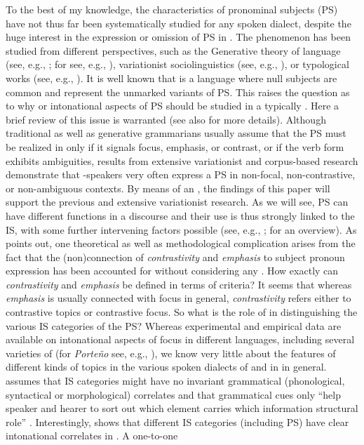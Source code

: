 \documentclass[output=paper]{langsci/langscibook}
\begin{document}
To the best of my knowledge, the  characteristics of pronominal subjects (PS) have not thus far been systematically studied for any spoken  dialect, despite the huge interest in the expression or omission of PS in . The phenomenon has been studied from different perspectives, such as the Generative theory of language (see, e.g., \citealt{Chomsky1981,Chomsky1995,Rizzi1986,Biberauer2010}; for  see, e.g., \citealt{Lujan1999}), variationist sociolinguistics (see, e.g., \citealt{SilvaCorvalan.2001,Otheguy2007,Carvalho2015}), or typological works (see, e.g., \citealt{Dryer2013}). It is well known that  is a language where null subjects are common and represent the unmarked variants of PS. This raises the question as to why  or intonational aspects of PS should be studied in a typically . Here a brief review of this issue is warranted (see also  for more details). Although traditional as well as generative grammarians usually assume that the PS must be realized in  only if it signals focus, emphasis, or contrast, or if the verb form exhibits ambiguities, results from extensive variationist and corpus-based research demonstrate that -speakers very often express a PS in non-focal, non-contrastive, or non-ambiguous contexts. By means of an , the findings of this paper will support the previous and extensive variationist research. As we will see, PS can have different functions in a discourse and their use is thus strongly linked to the IS, with some further intervening factors possible (see, e.g., \citealt{Carvalho2015,Peskova.2015}; for an overview). As \citet[14]{Posio2012} points out, one theoretical as well as methodological complication arises from the fact that the (non)connection of \textit{contrastivity} and \textit{emphasis} to subject pronoun expression has been accounted for without considering any . How exactly can \textit{contrastivity} and \textit{emphasis} be defined in terms of  criteria? It seems that whereas \textit{emphasis} is usually connected with focus in general, \textit{contrastivity} refers either to contrastive topics or contrastive focus. So what is the role of  in distinguishing the various IS categories of the PS? Whereas experimental and empirical data are available on intonational aspects of focus in different languages, including several varieties of  (for \textit{Porte{\~n}o} see, e.g., \citealt{Colantoni2004,Gabriel2010incollection,Feldhausen2011,LeGac2014}), we know very little about the  features of different kinds of topics in the various spoken dialects of  and in  in general. \citet{Fery.2007} assumes that IS categories might have no invariant grammatical (phonological, syntactical or morphological) correlates and that grammatical cues only ``help speaker and hearer to sort out which element carries which information structural role'' \citep[161]{Fery.2007}. Interestingly, \citet{Frascarelli2007} shows that different IS categories (including PS) have clear intonational correlates in . A one-to-one 
\end{document}
